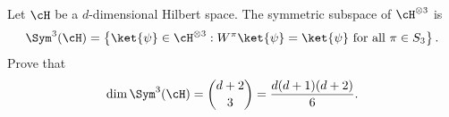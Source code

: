 Let $\cH$ be a $d$-dimensional Hilbert space. The symmetric subspace of $\cH^{\otimes3}$ is
$$
\Sym^3(\cH)
=
\left\{
\ket{\psi}\in\cH^{\otimes3}:
W^\pi\ket{\psi}=\ket{\psi}\text{ for all }\pi\in S_3
\right\}.
$$
Prove that
$$
\dim\Sym^3(\cH)
=
\binom{d+2}{3}
=
\frac{d(d+1)(d+2)}{6}.
$$
